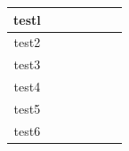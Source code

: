 \begin{table}[]
\begin{tabular}{|c|cc|cccc|}
    testl                   & \multicolumn{1}{c|}{}                                                      &                                                    & \multicolumn{1}{c|}{}                                                      & \multicolumn{1}{c|}{}                                                   & \multicolumn{1}{c|}{}                                                      &                                                    \\ \hline
    test2                   & \multicolumn{1}{c|}{}                                                      &                                                    & \multicolumn{1}{c|}{}                                                      & \multicolumn{1}{c|}{}                                                   & \multicolumn{1}{c|}{}                                                      &                                                    \\ \hline
    test3                   & \multicolumn{1}{c|}{}                                                      &                                                    & \multicolumn{1}{c|}{}                                                      & \multicolumn{1}{c|}{}                                                   & \multicolumn{1}{c|}{}                                                      &                                                    \\ \hline
    test4                   & \multicolumn{1}{c|}{}                                                      &                                                    & \multicolumn{1}{c|}{}                                                      & \multicolumn{1}{c|}{}                                                   & \multicolumn{1}{c|}{}                                                      &                                                    \\ \hline
    test5                   & \multicolumn{1}{c|}{}                                                      &                                                    & \multicolumn{1}{c|}{}                                                      & \multicolumn{1}{c|}{}                                                   & \multicolumn{1}{c|}{}                                                      &                                                    \\ \hline
    test6                   & \multicolumn{1}{c|}{}                                                      &                                                    & \multicolumn{1}{c|}{}                                                      & \multicolumn{1}{c|}{}                                                   & \multicolumn{1}{c|}{}                                                      &                                                    \\ \hline

\end{tabular}
\end{table}
